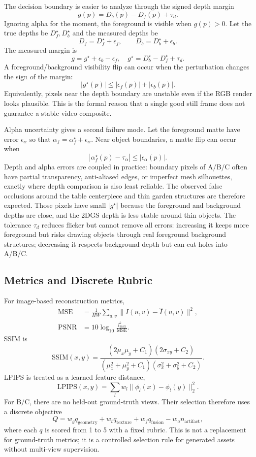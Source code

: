 \documentclass[10pt,twocolumn,letterpaper]{article}
\begin{document}
The decision boundary is easier to analyze through the signed depth margin
\[
g(p)=D_b(p)-D_f(p)+\tau_d .
\]
Ignoring alpha for the moment, the foreground is visible when $g(p)>0$.
Let the true depths be $D_f^\star,D_b^\star$ and the measured depths be
\[
D_f=D_f^\star+\epsilon_f,\qquad
D_b=D_b^\star+\epsilon_b .
\]
The measured margin is
\[
g=g^\star+\epsilon_b-\epsilon_f,
\quad
g^\star=D_b^\star-D_f^\star+\tau_d .
\]
A foreground/background visibility flip can occur when the perturbation changes the sign of the margin:
\[
|g^\star(p)|
\le
|\epsilon_f(p)|+|\epsilon_b(p)|.
\]
Equivalently, pixels near the depth boundary are unstable even if the RGB render looks plausible.
This is the formal reason that a single good still frame does not guarantee a stable video composite.

Alpha uncertainty gives a second failure mode.
Let the foreground matte have error $\epsilon_\alpha$ so that $\alpha_f=\alpha_f^\star+\epsilon_\alpha$.
Near object boundaries, a matte flip can occur when
\[
|\alpha_f^\star(p)-\tau_\alpha|\le |\epsilon_\alpha(p)|.
\]
Depth and alpha errors are coupled in practice: boundary pixels of A/B/C often have partial transparency, anti-aliased edges, or imperfect mesh silhouettes, exactly where depth comparison is also least reliable.
The observed false occlusions around the table centerpiece and thin garden structures are therefore expected.
Those pixels have small $|g^\star|$ because the foreground and background depths are close, and the 2DGS depth is less stable around thin objects.
The tolerance $\tau_d$ reduces flicker but cannot remove all errors: increasing it keeps more foreground but risks drawing objects through real foreground background structures; decreasing it respects background depth but can cut holes into A/B/C.

\subsection{Metrics and Discrete Rubric}
For image-based reconstruction metrics,
\[
\begin{aligned}
\mathrm{MSE}
&=\frac{1}{HW}\sum_{u,v}\|I(u,v)-\hat I(u,v)\|^2,\\
\mathrm{PSNR}
&=10\log_{10}\frac{I_{\max}^2}{\mathrm{MSE}}.
\end{aligned}
\]
SSIM is
\[
\mathrm{SSIM}(x,y)=
\frac{(2\mu_x\mu_y+C_1)(2\sigma_{xy}+C_2)}
{(\mu_x^2+\mu_y^2+C_1)(\sigma_x^2+\sigma_y^2+C_2)}.
\]
LPIPS is treated as a learned feature distance,
\[
\mathrm{LPIPS}(x,y)=\sum_l w_l\|\phi_l(x)-\phi_l(y)\|_2^2.
\]
For B/C, there are no held-out ground-truth views.
Their selection therefore uses a discrete objective
\[
Q=w_g q_{\mathrm{geometry}}+w_t q_{\mathrm{texture}}+w_f q_{\mathrm{fusion}}-w_a n_{\mathrm{artifact}},
\]
where each $q$ is scored from 1 to 5 with a fixed rubric.
This is not a replacement for ground-truth metrics; it is a controlled selection rule for generated assets without multi-view supervision.
\end{document}
